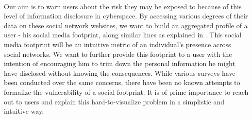 \documentclass[11pt]{article}
\begin{document}
\paragraph{}
Our aim is to warn users about the risk they may be exposed to because of this level of information disclosure in cyberspace. By accessing various degrees of their data on these social network websites, we want to build an aggregated profile of a user - his social media footprint, along similar lines as explained in \cite{emergingthreat}. This social media footprint will be an intuitive metric of an individual’s presence across social networks. We want to further provide this footprint to a user with the intention of encouraging him to trim down the personal information he might have disclosed without knowing the consequences. While various surveys have been conducted over the same concerns, there have been no known attempts to formalize the vulnerability of a social footprint. It is of prime importance to reach out to users and explain this hard-to-visualize problem in a simplistic and intuitive way.
\end{document}
